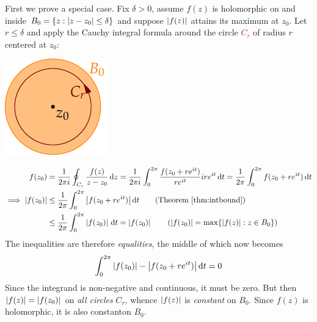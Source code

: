 \begin{tcolorbox}[proofstyle]
\begin{minipage}[t]{0.75\linewidth}\vspace{0pt}
First we prove a special case.\smallbreak
Fix $\delta>0$, assume $f(z)$ is holomorphic on and inside $B_0=\{z:\left| z-z_0\right|\le\delta\}$ and suppose $\left| f(z)\right|$ attains its maximum at $z_0$.\smallbreak
Let $r\le\delta$ and apply the Cauchy integral formula around the circle \textcolor{brown}{$C_{r}$} of radius $r$ centered at $z_0$:
\end{minipage}\begin{minipage}[t]{0.25\linewidth}\vspace{0pt}
\flushright\includegraphics[scale=1]{maxmod2}
\end{minipage}\par
\vspace{-10pt}
\begin{align*}
f(z_0)&=\frac 1{2\pi i}\oint_{C_{r}}\frac{f(z)}{z-z_0}\,\dz =\frac 1{2\pi i}\int_0^{2\pi}\frac{f(z_0+r e^{it})}{r e^{it}}ir e^{it}\,\dt =\frac 1{2\pi}\int_0^{2\pi}f(z_0+r e^{it})\,\dt\\
\implies \nm{f(z_0)}&\le \frac 1{2\pi}\int_0^{2\pi}\nm{f(z_0+r e^{it})}\dt \tag{Theorem \ref{thm:intbound}}\\
&\le \frac 1{2\pi}\int_0^{2\pi}\nm{f(z_0)}\,\dt =\nm{f(z_0)} \tag{$\nm{f(z_0)}=\max\{\nm{f(z)}:z\in B_0\}$}
\end{align*}
The inequalities are therefore \emph{equalities,} the middle of which now becomes
\[\int_0^{2\pi}\left| f(z_0)\right|-\left| f(z_0+r e^{it})\right|{\mathrm{d} t}=0\]
Since the integrand is non-negative and continuous, it must be zero. But then $\left| f(z)\right|=\left| f(z_0)\right|$ on \emph{all circles} $C_r$, whence $\left| f(z)\right|$ is \emph{constant} on $B_0$. Since $f(z)$ is holomorphic, it is also constant\footnotemark on $B_0$.
\end{tcolorbox}

